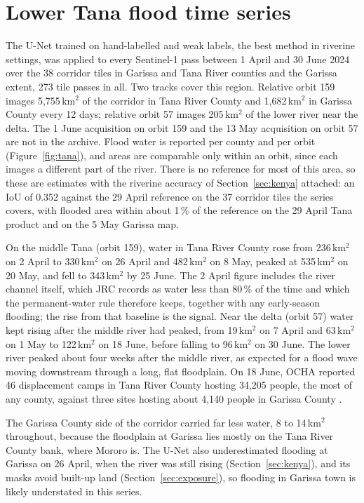 \documentclass[11pt]{article}
\begin{document}
\section{Lower Tana flood time series}
\label{sec:tana}

The U-Net trained on hand-labelled and weak labels, the best method in
riverine settings, was applied to every Sentinel-1 pass between 1 April and
30 June 2024 over the 38 corridor tiles in Garissa and Tana River counties
and the Garissa extent, 273 tile passes in all. Two tracks cover this region.
Relative orbit 159 images 5,755\,km$^2$ of the corridor in Tana River County
and 1,682\,km$^2$ in Garissa County every 12 days; relative orbit 57 images
205\,km$^2$ of the lower river near the delta. The 1 June acquisition on orbit
159 and the 13 May acquisition on orbit 57 are not in the archive. Flood water
is reported per county and per orbit (Figure~\ref{fig:tana}), and areas are
comparable only within an orbit, since each images a different part of the
river. There is no reference for most of this area, so these are estimates
with the riverine accuracy of Section~\ref{sec:kenya} attached: an IoU of
0.352 against the 29 April reference on the 37 corridor tiles the series
covers, with flooded area within about 1\,\% of the
reference on the 29 April Tana product and on the 5 May Garissa map.

On the middle Tana (orbit 159), water in Tana River County rose from
236\,km$^2$ on 2 April to 330\,km$^2$ on 26 April and 482\,km$^2$ on 8 May,
peaked at 535\,km$^2$ on 20 May, and fell to 343\,km$^2$ by 25 June. The
2 April figure includes the river channel itself, which JRC records as water
less than 80\,\% of the time and which the permanent-water rule therefore
keeps, together with any early-season flooding; the rise from that baseline is
the signal. Near the delta (orbit 57) water kept rising after the middle
river had peaked, from 19\,km$^2$ on 7 April and 63\,km$^2$ on 1 May to
122\,km$^2$ on 18 June, before falling to 96\,km$^2$ on 30 June. The lower
river peaked about four weeks after the middle river, as expected for a flood
wave moving downstream through a long, flat floodplain. On 18 June, OCHA
reported 46 displacement camps in Tana River County hosting 34,205 people, the
most of any county, against three sites hosting about 4,140 people in Garissa
County \cite{ocha2024fu7}.

The Garissa County side of the corridor carried far less water, 8 to
14\,km$^2$ throughout, because the floodplain at Garissa lies mostly on the
Tana River County bank, where Mororo is. The U-Net also underestimated
flooding at Garissa on 26 April, when the river was still rising
(Section~\ref{sec:kenya}), and its masks avoid built-up land
(Section~\ref{sec:exposure}), so flooding in Garissa town is likely
understated in this series.
\end{document}
